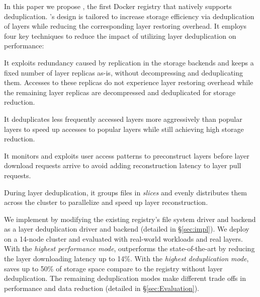In this paper we propose \sysname, the first Docker registry that natively
supports deduplication.
%
\sysname's design is tailored to
increase storage efficiency via deduplication of layers while
reducing the corresponding layer restoring overhead. 
 
It employs four key techniques to reduce
the impact of utilizing layer deduplication on performance: 
%
%
\begin{compactenumerate}
\item It exploits redundancy caused by replication in the storage backends and keeps a fixed
number of layer replicas as-is, without decompressing and deduplicating them.
%
Accesses to these replicas do not experience layer restoring overhead while
the remaining layer replicas are decompressed
and deduplicated for storage reduction.
%
\item It deduplicates less frequently accessed layers more
aggressively than popular layers to speed up accesses to popular
layers while still achieving high storage reduction.
%
\item It monitors and exploits user access patterns to preconstruct
layers before layer download requests arrive to avoid adding reconstruction
latency to layer pull requests.
%
\item During layer deduplication, it groups files in \emph{slices} and evenly
distributes them across the cluster to parallelize and speed up layer reconstruction.
%
\end{compactenumerate}



We implement \sysname by modifying the existing registry's file system driver and backend as a 
layer deduplication driver and backend (detailed in \S\ref{sec:impl}).
We deploy \sysname
on a 14-node cluster and evaluated with real-world workloads and real layers.
With the \emph{highest performance mode},
\sysname outperforms the state-of-the-art by reducing the layer downloading latency up to 14\%.
With the \emph{highest deduplication mode},
\sysname saves up to 50\% of storage space compare to the registry without layer deduplication.
The remaining deduplication modes make different trade offs in performance and data reduction (detailed in \S\ref{sec:Evaluation}).
%
